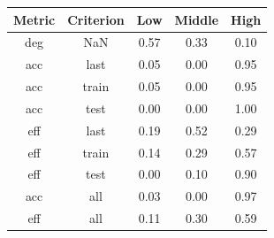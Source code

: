 \begin{tabular}{|c|c|c|c|c|}
\toprule
Metric & Criterion & Low & Middle & High \\
\midrule
deg & NaN & 0.57 & 0.33 & 0.10 \\
acc & last & 0.05 & 0.00 & 0.95 \\
acc & train & 0.05 & 0.00 & 0.95 \\
acc & test & 0.00 & 0.00 & 1.00 \\
eff & last & 0.19 & 0.52 & 0.29 \\
eff & train & 0.14 & 0.29 & 0.57 \\
eff & test & 0.00 & 0.10 & 0.90 \\
acc & all & 0.03 & 0.00 & 0.97 \\
eff & all & 0.11 & 0.30 & 0.59 \\
\bottomrule
\end{tabular}
